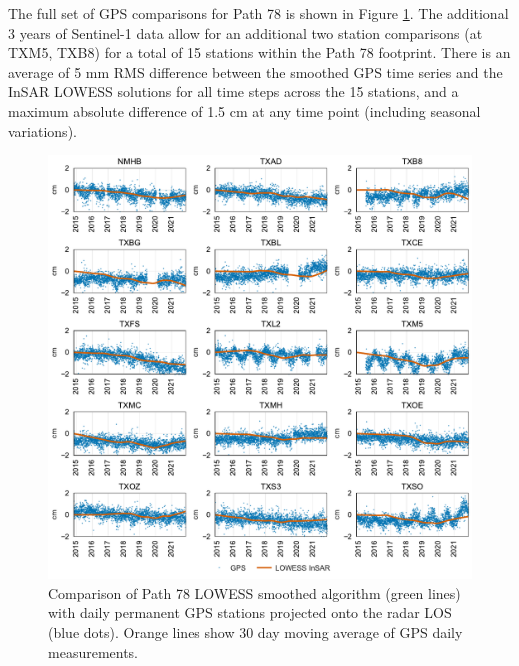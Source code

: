 The full set of GPS comparisons for Path 78 is shown in Figure \ref{fig:ch5-results-gps}. 
The additional 3 years of Sentinel-1 data allow for an additional two station comparisons (at TXM5, TXB8) for a total of 15 stations within the Path 78 footprint.
There is an average of 5 mm RMS difference between the smoothed GPS time series and the InSAR LOWESS solutions for all time steps across the 15 stations, and a maximum absolute difference of 1.5 cm at any time point (including seasonal variations).



\begin{figure}
	\centering
	\includegraphics[width=.99\textwidth]{figures/chapter5-lowess/gps_path78.pdf}
	\caption[Full GPS comparison for Path 78 LOWESS solutions]{
		Comparison of Path 78 LOWESS smoothed algorithm (green lines) with daily permanent GPS stations projected onto the radar LOS (blue dots). Orange lines show 30 day moving average of GPS daily measurements.
	}
	\label{fig:ch5-results-gps}
\end{figure}

\FloatBarrier



